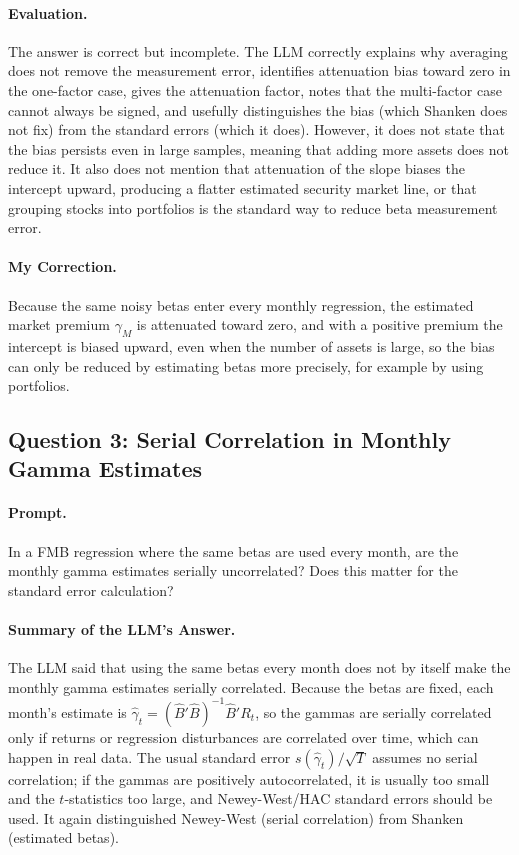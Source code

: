 \paragraph{Evaluation.} The answer is correct but incomplete. The LLM correctly
explains why averaging does not remove the measurement error, identifies
attenuation bias toward zero in the one-factor case, gives the attenuation
factor, notes that the multi-factor case cannot always be signed, and usefully
distinguishes the bias (which Shanken does not fix) from the standard errors
(which it does). However, it does not state that the bias persists even in
large samples, meaning that adding more assets does not reduce it. It also does
not mention that attenuation of the slope biases the intercept upward,
producing a flatter estimated security market line, or that grouping stocks
into portfolios is the standard way to reduce beta measurement error.

\paragraph{My Correction.} Because the same noisy betas enter every monthly
regression, the estimated market premium $\gamma_M$ is attenuated toward zero,
and with a positive premium the intercept is biased upward, even when the
number of assets is large, so the bias can only be reduced by estimating betas
more precisely, for example by using portfolios.

\subsection{Question 3: Serial Correlation in Monthly Gamma Estimates}

\paragraph{Prompt.} In a FMB regression where the same betas are used every
month, are the monthly gamma estimates serially uncorrelated? Does this matter
for the standard error calculation?

\paragraph{Summary of the LLM's Answer.} The LLM said that using the same betas
every month does not by itself make the monthly gamma estimates serially
correlated. Because the betas are fixed, each month's estimate is
$\hat\gamma_t = (\hat B'\hat B)^{-1}\hat B' R_t$, so the gammas are serially
correlated only if returns or regression disturbances are correlated over time,
which can happen in real data. The usual standard error
$s(\hat\gamma_t)/\sqrt{T}$ assumes no serial correlation; if the gammas are
positively autocorrelated, it is usually too small and the $t$-statistics too
large, and Newey-West/HAC standard errors should be used. It again
distinguished Newey-West (serial correlation) from Shanken (estimated betas).

